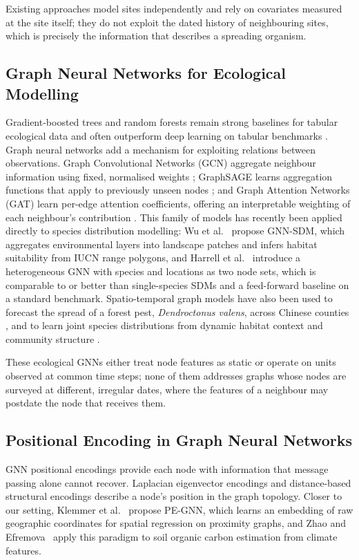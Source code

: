 \documentclass[a4paper,fleqn]{cas-sc}
\begin{document}
Existing approaches model sites independently and rely on covariates measured at the site itself; they do not exploit the dated history of neighbouring sites, which is precisely the information that describes a spreading organism.

\subsection{Graph Neural Networks for Ecological Modelling}

Gradient-boosted trees and random forests remain strong baselines for tabular ecological data \citep{valavi2022} and often outperform deep learning on tabular benchmarks \citep{grinsztajn2022}. Graph neural networks add a mechanism for exploiting relations between observations. Graph Convolutional Networks (GCN) aggregate neighbour information using fixed, normalised weights \citep{kipf2017}; GraphSAGE learns aggregation functions that apply to previously unseen nodes \citep{hamilton2017}; and Graph Attention Networks (GAT) learn per-edge attention coefficients, offering an interpretable weighting of each neighbour's contribution \citep{velickovic2018}. This family of models has recently been applied directly to species distribution modelling: Wu et al.~\citep{wu2025} propose GNN-SDM, which aggregates environmental layers into landscape patches and infers habitat suitability from IUCN range polygons, and Harrell et al.~\citep{harrell2025} introduce a heterogeneous GNN with species and locations as two node sets, which is comparable to or better than single-species SDMs and a feed-forward baseline on a standard benchmark. Spatio-temporal graph models have also been used to forecast the spread of a forest pest, \textit{Dendroctonus valens}, across Chinese counties \citep{zhou2026}, and to learn joint species distributions from dynamic habitat context and community structure \citep{kong2026}.

These ecological GNNs either treat node features as static or operate on units observed at common time steps; none of them addresses graphs whose nodes are surveyed at different, irregular dates, where the features of a neighbour may postdate the node that receives them.

\subsection{Positional Encoding in Graph Neural Networks}

GNN positional encodings provide each node with information that message passing alone cannot recover. Laplacian eigenvector encodings \citep{dwivedi2020} and distance-based structural encodings \citep{li2020} describe a node's position in the graph topology. Closer to our setting, Klemmer et al.~\citep{klemmer2023pegnn} propose PE-GNN, which learns an embedding of raw geographic coordinates for spatial regression on proximity graphs, and Zhao and Efremova~\citep{zhao2023} apply this paradigm to soil organic carbon estimation from climate features.
\end{document}
